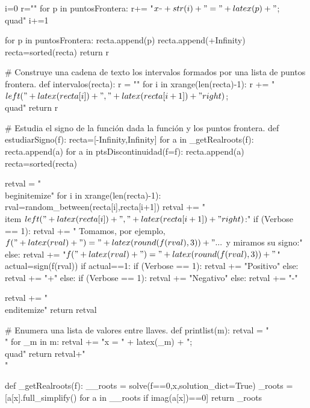 \begin{sagesilent}
    i=0
    r=""
    for p in puntosFrontera:
        r+= "$x_"+str(i)+"="+latex(p)+"$;\\quad"
        i+=1

    for p in puntosFrontera:
        recta.append(p)
    recta.append(+Infinity)
    recta=sorted(recta)
    return r

# Construye una cadena de texto los intervalos formados por una lista de puntos frontera.
def intervalos(recta):
    r = ""
    for i in xrange(len(recta)-1):
        r += "$\\left("+latex(recta[i])+","+latex(recta[i+1])+"\\right)$;\\quad"  
    return r


# Estudia el signo de la función dada la función y los puntos frontera.
def estudiarSigno(f):
    recta=[-Infinity,Infinity]
    for a in _getRealroots(f):
        recta.append(a)
    for a in ptsDiscontinuidad(f=f):
        recta.append(a)
    recta=sorted(recta) 

    retval = "\\begin{itemize}"
    for i in xrange(len(recta)-1):
        rval=random_between(recta[i],recta[i+1])
        retval += "\\item $\\left("+latex(recta[i])+","+latex(recta[i+1])+"\\right)$:"
        if (Verbose == 1):
            retval += " Tomamos, por ejemplo, $f("+latex(rval)+") = "+latex(round(f(rval),3))+"...$  y miramos su signo:" 
        else:
            retval += "$f("+latex(rval)+") = "+latex(round(f(rval),3)) +"$"
        actual=sign(f(rval))
        if actual==1: 
            if (Verbose == 1):
                retval += "Positivo"  
            else:
                retval += "+"
        else:
            if (Verbose == 1):
                retval += "Negativo"
            else:
                retval += "-"

    retval += "\\end{itemize}"
    return retval

# Enumera una lista de valores entre llaves.
def printlist(m):
    retval = "\\{"
    for _m in m:
    	retval += "x = " + latex(_m) + ";\\quad"
    return retval+"\\}"



def _getRealroots(f):
 __roots = solve(f==0,x,solution_dict=True)
 _roots = [a[x].full_simplify() for a in __roots if imag(a[x])==0]
 return _roots




\end{sagesilent}
